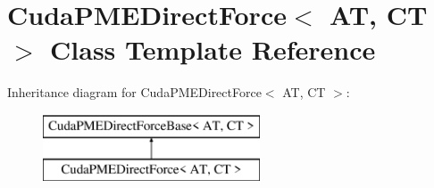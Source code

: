 \hypertarget{classCudaPMEDirectForce}{}\section{Cuda\+P\+M\+E\+Direct\+Force$<$ AT, CT $>$ Class Template Reference}
\label{classCudaPMEDirectForce}
Inheritance diagram for Cuda\+P\+M\+E\+Direct\+Force$<$ AT, CT $>$\+:\begin{figure}[H]
\begin{center}
\leavevmode
\includegraphics[height=2.000000cm]{classCudaPMEDirectForce}
\end{center}
\end{figure}
